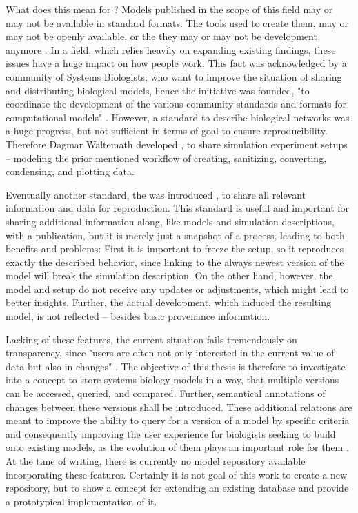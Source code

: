 What does this mean for \sysbio? Models published in the scope of this field may or may not be available in standard formats. The tools used to create them, may or may not be openly available, or the they may or may not be development anymore \citep{Peng2011}.
In a field, which relies heavily on expanding existing findings, these issues have a huge impact on how people work.
This fact was acknowledged by a community of Systems Biologists, who want to improve the situation of sharing and distributing biological models, hence the \combine initiative was founded, "to coordinate the development of the various community standards and formats for computational models" \citep{COMBINE}.
However, a standard to describe biological networks was a huge progress, but not sufficient in terms of goal to ensure reproducibility. Therefore Dagmar Waltemath developed \sedml \citep{Waltemath2011a}, to share simulation experiment setups -- modeling the prior mentioned workflow of creating, sanitizing, converting, condensing, and plotting data.

Eventually another standard, the \ca was introduced \citep{Bergmann2014a}, to share all relevant information and data for reproduction. This standard is useful and important for sharing additional information along, like models and simulation descriptions, with a publication, but it is merely just a snapshot of a process, leading to both benefits and problems: First it is important to freeze the setup, so it reproduces exactly the described behavior, since linking to the always newest version of the model will break the simulation description. On the other hand, however, the model and setup do not receive any updates or adjustments, which might lead to better insights. Further, the actual development, which induced the resulting model, is not reflected -- besides basic provenance information.

Lacking of these features, the current situation fails tremendously on transparency, since "users are often not only interested in the current value of data but also in changes" \citep{Cobena2002}.
The objective of this thesis is therefore to investigate into a concept to store systems biology models in a way, that multiple versions can be accessed, queried, and compared. Further, semantical annotations of changes between these versions shall be introduced. These additional relations are meant to improve the ability to query for a version of a model by specific criteria and consequently improving the user experience for biologists seeking to build onto existing models, as the evolution of them plays an important role for them \citep{Scharm2015}.
At the time of writing, there is currently no model repository available incorporating these features. Certainly it is not goal of this work to create a new repository, but to show a concept for extending an existing database and provide a prototypical implementation of it.

